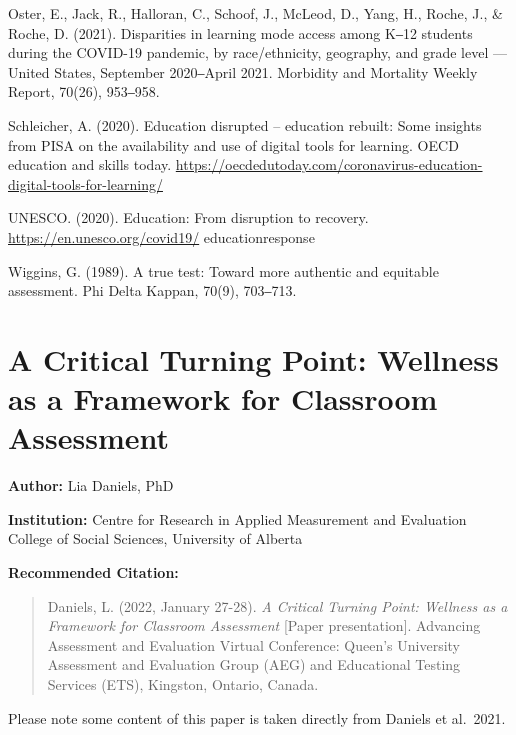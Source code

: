 \documentclass[
]{book}
\begin{document}
Oster, E., Jack, R., Halloran, C., Schoof, J., McLeod, D., Yang, H., Roche, J., \& Roche, D. (2021). Disparities in learning mode access among K‒12 students during the COVID-19 pandemic, by race/ethnicity, geography, and grade level --- United States, September 2020‒April 2021. Morbidity and Mortality Weekly Report, 70(26), 953‒958.

Schleicher, A. (2020). Education disrupted -- education rebuilt: Some insights from PISA on the availability and use of digital tools for learning. OECD education and skills today. \url{https://oecdedutoday.com/coronavirus-education-digital-tools-for-learning/}

UNESCO. (2020). Education: From disruption to recovery. \url{https://en.unesco.org/covid19/} educationresponse

Wiggins, G. (1989). A true test: Toward more authentic and equitable assessment. Phi Delta Kappan, 70(9), 703‒713.

\newpage
\pagestyle{fancy}

\hypertarget{a-critical-turning-point-wellness-as-a-framework-for-classroom-assessment}{%
\section{A Critical Turning Point: Wellness as a Framework for Classroom Assessment}\label{a-critical-turning-point-wellness-as-a-framework-for-classroom-assessment}}

\fancyhead[LE,RO]{\nouppercase{\truncate{0.5\headwidth}{\rightmark}}}
\fancyhead[LO,RE]{\nouppercase{\truncate{0.5\headwidth}{\leftmark}}}

\textbf{Author:} Lia Daniels, PhD

\textbf{Institution:} Centre for Research in Applied Measurement and Evaluation College of Social Sciences, University of Alberta

\textbf{Recommended Citation:}

\begin{quote}
Daniels, L. (2022, January 27-28). \emph{A Critical Turning Point: Wellness as a Framework for Classroom Assessment} {[}Paper presentation{]}. Advancing Assessment and Evaluation Virtual Conference: Queen's University Assessment and Evaluation Group (AEG) and Educational Testing Services (ETS), Kingston, Ontario, Canada.
\end{quote}

Please note some content of this paper is taken directly from Daniels et al.~2021.
\end{document}
